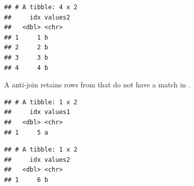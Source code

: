 \documentclass[krantz2]{krantz}\usepackage{knitr}
\begin{document}
\begin{knitrout}\footnotesize
{}\color{fgcolor}\begin{kframe}
\begin{alltt}
\hlstd{(}   
\end{alltt}


{\ttfamily\noindent\itshape{}}\begin{verbatim}
## # A tibble: 4 x 2
##     idx values2
##   <dbl> <chr>
## 1     1 b
## 2     2 b
## 3     3 b
## 4     4 b
\end{verbatim}
\end{kframe}
\end{knitrout}

A anti-join retains rows from  that do not have a match in .

\begin{knitrout}\footnotesize
{}\color{fgcolor}\begin{kframe}
\begin{alltt}
\hlstd{(}   
\end{alltt}


{\ttfamily\noindent\itshape{}}\begin{verbatim}
## # A tibble: 1 x 2
##     idx values1
##   <dbl> <chr>
## 1     5 a
\end{verbatim}
\end{kframe}
\end{knitrout}

\begin{knitrout}\footnotesize
{}\color{fgcolor}\begin{kframe}
\begin{alltt}
\hlstd{(}   
\end{alltt}


{\ttfamily\noindent\itshape{}}\begin{verbatim}
## # A tibble: 1 x 2
##     idx values2
##   <dbl> <chr>
## 1     6 b
\end{verbatim}
\end{kframe}
\end{knitrout}
\end{document}
